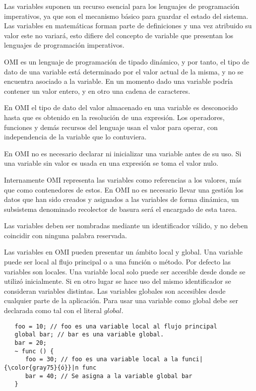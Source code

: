 Las variables suponen un recurso esencial para los lenguajes de programación imperativos, ya que son el mecanismo básico para guardar el estado del sistema. Las variables en matemáticas
forman parte de definiciones y una vez atribuido su valor este no variará, esto difiere del concepto de variable que presentan los lenguajes de programación imperativos. 


OMI es un lenguaje de programación de tipado dinámico, y por tanto, el tipo de dato de una variable está determinado por el valor actual de la misma, y no se encuentra 
asociado a la variable. En un momento dado una variable podría contener un valor entero, y en otro una cadena de caracteres. 

En OMI el tipo de dato del valor almacenado en una variable es desconocido hasta que es obtenido en la resolución de una expresión. Los operadores, funciones y demás recursos
del lenguaje usan el valor para operar, con independencia de la variable que lo contuviera.

En OMI no es necesario declarar ni inicializar una variable antes de su uso. Si una variable sin valor es usada en una expresión se toma el valor nulo.

Internamente OMI representa las variables como referencias a los valores, más que como contenedores de estos. En OMI no es necesario llevar una gestión los datos que han sido
creados y asignados a las variables de forma dinámica, un subsistema denominado recolector de basura será el encargado de esta tarea.

Las variables deben ser nombradas mediante un identificador válido, y no deben coincidir con ninguna palabra reservada. 

Las variables en OMI pueden presentar un ámbito local y global. Una variable puede ser local al flujo principal o a una función o método. Por defecto las variables son locales.
Una variable local solo puede ser accesible desde donde se utilizó inicialmente. Si en otro lugar se hace uso del mismo identificador se consideran variables distintas.
Las variables globales son accesibles desde cualquier parte de la aplicación. Para usar una variable como global debe ser declarada como tal con el literal $global$. \\


\begin{lstlisting}
   foo = 10; // foo es una variable local al flujo principal
   global bar; // bar es una variable global.
   bar = 20; 
   ~ func () {
      foo = 30; // foo es una variable local a la funci|{\color{gray75}{ó}}|n func
      bar = 40; // Se asigna a la variable global bar
   }
\end{lstlisting}

